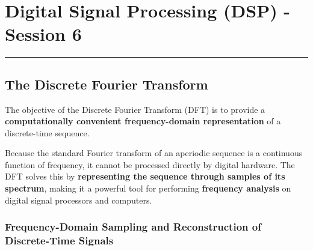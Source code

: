 \hypertarget{digital-signal-processing-dsp---session-6}{%
\section{Digital Signal Processing (DSP) - Session
6}\label{digital-signal-processing-dsp---session-6}}

\begin{center}\rule{0.5\linewidth}{0.5pt}\end{center}

\hypertarget{the-discrete-fourier-transform}{%
\subsection{The Discrete Fourier
Transform}\label{the-discrete-fourier-transform}}

The objective of the Discrete Fourier Transform (DFT) is to provide a
\textbf{computationally convenient frequency-domain representation} of a
discrete-time sequence.

Because the standard Fourier transform of an aperiodic sequence is a
continuous function of frequency, it cannot be processed directly by
digital hardware. The DFT solves this by \textbf{representing the
sequence through samples of its spectrum}, making it a powerful tool for
performing \textbf{frequency analysis} on digital signal processors and
computers.

\hypertarget{frequency-domain-sampling-and-reconstruction-of-discrete-time-signals}{%
\subsubsection{Frequency-Domain Sampling and Reconstruction of
Discrete-Time
Signals}\label{frequency-domain-sampling-and-reconstruction-of-discrete-time-signals}}


